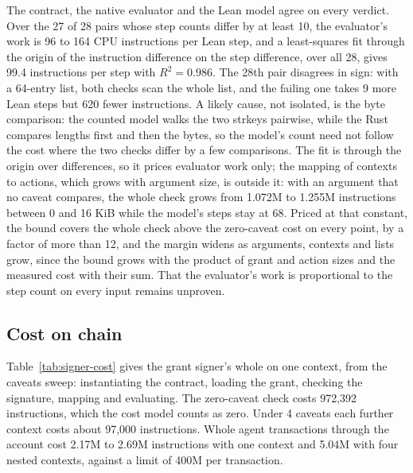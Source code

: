 The contract, the native evaluator and the Lean model agree on every verdict.
Over the 27 of 28 pairs whose step counts differ by at least 10, the
evaluator's work is 96 to 164 CPU instructions per Lean step, and a
least-squares fit through the origin of the instruction difference on the
step difference, over all 28, gives 99.4 instructions per step with
$R^2 = 0.986$. The 28th pair disagrees in sign: with a
64-entry  list, both checks scan the whole list, and the
failing one takes 9 more Lean steps but 620 fewer instructions. A likely
cause, not isolated, is the byte comparison: the counted model walks the two
strkeys pairwise, while the Rust compares lengths first and then the bytes,
so the model's count need not follow the cost where the two checks differ by
a few comparisons. The fit is through the origin over
differences, so it prices evaluator work only; the mapping of contexts to
actions, which grows with argument size, is outside it: with an argument that
no caveat compares, the whole check grows from 1.072M to 1.255M instructions
between 0 and 16 KiB while the model's steps stay at 68. Priced at that
constant, the bound covers the whole check above the zero-caveat cost on every
point, by a factor of more than 12, and the margin widens as arguments,
contexts and lists grow, since the bound grows with the product of grant and
action sizes and the measured cost with their sum. That
the evaluator's work is proportional to the step count on every input remains
unproven.

\subsection{Cost on chain}

Table~\ref{tab:signer-cost} gives the grant signer's whole
 on one context, from the caveats sweep: instantiating
the contract, loading the grant, checking the signature, mapping and
evaluating. The zero-caveat check costs 972,392 instructions, which the cost
model counts as zero. Under 4 caveats each further context costs about 97,000
instructions. Whole agent transactions through the
account cost 2.17M to 2.69M instructions with one context and 5.04M with four
nested contexts, against a limit of 400M per
transaction.

